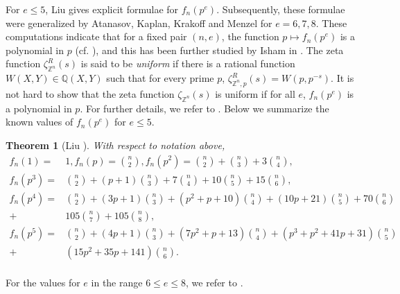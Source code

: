 \documentclass[a4paper]{amsart}
\newtheorem{theorem}{Theorem}[section]
\numberwithin{equation}{section}
\theoremstyle{remark}
\newcommand{\Z}{\mathbb{Z}}
\newcommand{\Q}{\mathbb{Q}}
\begin{document}
For $e\leq 5$, Liu \cite{liu2007counting} gives explicit formulae for $f_n(p^e)$. Subsequently, these formulae were generalized by Atanasov, Kaplan, Krakoff and Menzel \cite{atanasov2021counting} for $e=6,7,8$. These computations indicate that for a fixed pair $(n,e)$, the function $p\mapsto f_n(p^e)$ is a polynomial in $p$ (cf. \cite[Question 1.13]{atanasov2021counting}), and this has been further studied by Isham in \cite{isham2022number}. The zeta function $\zeta_{\Z^n}^R(s)$ is said to be \emph{uniform} if there is a rational function $W(X,Y)\in \Q(X,Y)$ such that for every prime $p$, $\zeta_{\Z^n,p}^R(s)=W(p,p^{-s})$. It is not hard to show that the zeta function $\zeta_{\Z^n}(s)$ is uniform if for all $e$, $f_n(p^e)$ is a polynomial in $p$. For further details, we refer to \cite[section 5.1]{atanasov2021counting}. Below we summarize the known values of $f_n(p^e)$ for $e\leq 5$.
\begin{theorem}[Liu \cite{liu2007counting}]\label{theorem1.2}
With respect to notation above,
\[\begin{split}
f_n(1)= & 1,
f_n(p)=\binom{n}{2},f_n(p^2)=\binom{n}{2} + \binom{n}{3} + 3 \binom{n}{4}, \\
f_n(p^3) = & \binom{n}{2} + (p+1) \binom{n}{3} + 7 \binom{n}{4} + 10 \binom{n}{5} + 15 \binom{n}{6},\\
f_n(p^4)= & \binom{n}{2} + (3p+1) \binom{n}{3} + (p^2+p+10) \binom{n}{4}  +  (10p+21) \binom{n}{5} + 70 \binom{n}{6} \\ + & 105 \binom{n}{7} + 105 \binom{n}{8},\\
 f_n(p^5)  = & {n \choose 2} + (4p + 1){n \choose 3} + (7p^2 + p + 13){n \choose 4}
+ (p^3 + p^2 + 41p + 31){n \choose 5}\\ + & (15p^2 + 35p + 141){n \choose 6}.\\ 
\end{split}\]
\end{theorem}
For the values for $e$ in the range $6\leq e\leq 8$, we refer to \cite{kaplan2015distribution}.
\end{document}
